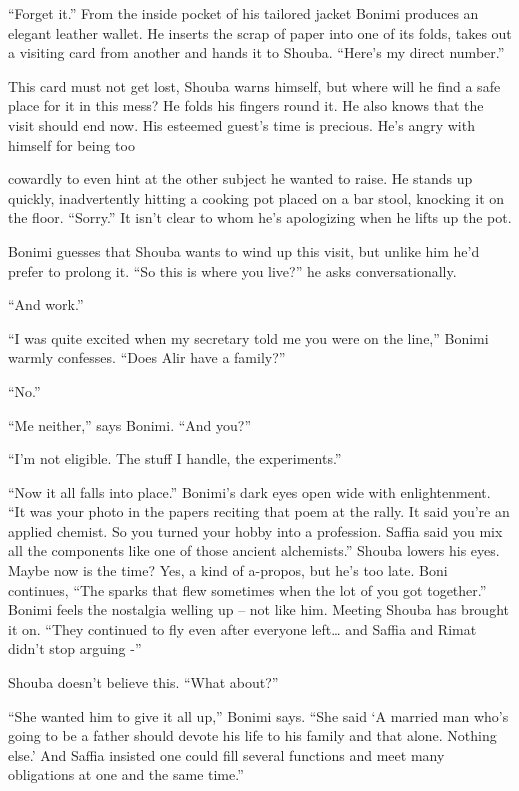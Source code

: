 \documentclass[twoside,11pt]{book}
\begin{document}
``Forget it.'' From the inside pocket of his tailored jacket Bonimi produces an elegant
leather wallet. He inserts the scrap of paper into one of its folds, takes out a visiting card from another and hands
it to Shouba. ``Here's my direct number.''

This card must not get lost, Shouba warns himself, but where will he find a safe place for it in this mess? He folds his
fingers round it. He also knows that the visit should end now. His esteemed guest's time is precious.
He's angry with himself for being too

cowardly to even hint at the other subject he wanted to raise. He stands up quickly, inadvertently hitting a cooking
pot placed on a bar stool, knocking it on the floor. ``Sorry.'' It isn't clear to whom he's
apologizing when he lifts up the pot.

Bonimi guesses that Shouba wants to wind up this visit, but unlike him he'd prefer to prolong it. ``So this
is where you live?'' he asks conversationally.

``And work.''

``I was quite excited when my secretary told me you were on the line,'' Bonimi warmly
confesses. ``Does Alir have a family?''

``No.''

``Me neither,'' says Bonimi. ``And you?''

``I'm not eligible. The stuff I handle, the experiments.''

``Now it all falls into place.'' Bonimi's dark eyes open wide with enlightenment.
``It was your photo in the papers reciting that poem at the rally. It said you're an applied chemist. So
you turned your hobby into a profession. Saffia said you mix all the components like one of those ancient
alchemists.'' Shouba lowers his eyes. Maybe now is the time? Yes, a kind of a-propos, but he's too late.
Boni continues, ``The sparks that flew sometimes when the lot of you got together.''
Bonimi feels the nostalgia welling up -- not like him. Meeting Shouba has brought it on. ``They continued
to fly even after everyone left{\dots} and Saffia and Rimat didn't stop arguing -''

Shouba doesn't believe this. ``What about?''

``She wanted him to give it all up,'' Bonimi says. ``She said
`A married man who's going to be a father should devote his life to his family and that alone. Nothing else.' And Saffia
insisted one could fill several functions and meet many obligations at one and the same time.''
\end{document}
